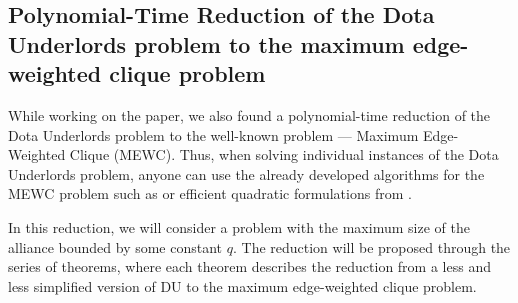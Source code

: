 \documentclass[smallextended]{svjour3}       %
\begin{document}
\subsection{Polynomial-Time Reduction of the Dota Underlords problem to the maximum edge-weighted clique problem}
While working on the paper, we also found a polynomial-time reduction of the Dota Underlords problem to the well-known problem --- Maximum Edge-Weighted Clique (MEWC). Thus, when solving individual instances of the Dota Underlords problem, anyone can use the already developed algorithms for the MEWC problem such as \cite{san2019new} or efficient quadratic formulations from \cite{hosseinian2017maximum}.

In this reduction, we will consider a problem with the maximum size of the alliance bounded by some constant $q$. The reduction will be proposed through the series of theorems, where each theorem describes the reduction from a less and less simplified version of DU to the maximum edge-weighted clique problem.
\end{document}
